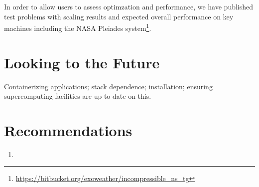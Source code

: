 \documentclass[12pt, titlepage]{aastex62}
\begin{document}
In order to allow users to assess optimzation and performance, we have published test problems with scaling results and expected overall performance on key machines including the NASA Pleiades system\footnote{\url{https://bitbucket.org/exoweather/incompressible_ns_tg}}. 

\section{Looking to the Future}
\label{sec:future}

Containerizing applications; stack dependence; installation; ensuring supercomputing facilities are up-to-date on this.

\section{Recommendations}
\label{sec:recommendations}

\begin{enumerate}
\item 
\end{enumerate}

{\footnotesize
%

}
\end{document}
